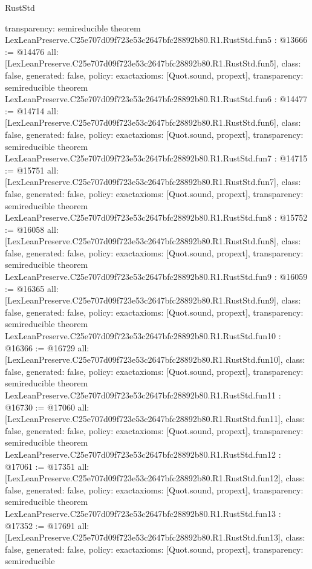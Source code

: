 \begin{lexlean}{RustStd}
\begin{coremodule}
{  transparency: semireducible
}
theorem LexLeanPreserve.C25e707d09f723e53c2647bfc28892b80.R1.RustStd.fun5 : @13666 := @14476 {
  all: [LexLeanPreserve.C25e707d09f723e53c2647bfc28892b80.R1.RustStd.fun5],
  class: false,
  generated: false,
  policy: exact{axioms: [Quot.sound, propext]},
  transparency: semireducible
}
theorem LexLeanPreserve.C25e707d09f723e53c2647bfc28892b80.R1.RustStd.fun6 : @14477 := @14714 {
  all: [LexLeanPreserve.C25e707d09f723e53c2647bfc28892b80.R1.RustStd.fun6],
  class: false,
  generated: false,
  policy: exact{axioms: [Quot.sound, propext]},
  transparency: semireducible
}
theorem LexLeanPreserve.C25e707d09f723e53c2647bfc28892b80.R1.RustStd.fun7 : @14715 := @15751 {
  all: [LexLeanPreserve.C25e707d09f723e53c2647bfc28892b80.R1.RustStd.fun7],
  class: false,
  generated: false,
  policy: exact{axioms: [Quot.sound, propext]},
  transparency: semireducible
}
theorem LexLeanPreserve.C25e707d09f723e53c2647bfc28892b80.R1.RustStd.fun8 : @15752 := @16058 {
  all: [LexLeanPreserve.C25e707d09f723e53c2647bfc28892b80.R1.RustStd.fun8],
  class: false,
  generated: false,
  policy: exact{axioms: [Quot.sound, propext]},
  transparency: semireducible
}
theorem LexLeanPreserve.C25e707d09f723e53c2647bfc28892b80.R1.RustStd.fun9 : @16059 := @16365 {
  all: [LexLeanPreserve.C25e707d09f723e53c2647bfc28892b80.R1.RustStd.fun9],
  class: false,
  generated: false,
  policy: exact{axioms: [Quot.sound, propext]},
  transparency: semireducible
}
theorem LexLeanPreserve.C25e707d09f723e53c2647bfc28892b80.R1.RustStd.fun10 : @16366 := @16729 {
  all: [LexLeanPreserve.C25e707d09f723e53c2647bfc28892b80.R1.RustStd.fun10],
  class: false,
  generated: false,
  policy: exact{axioms: [Quot.sound, propext]},
  transparency: semireducible
}
theorem LexLeanPreserve.C25e707d09f723e53c2647bfc28892b80.R1.RustStd.fun11 : @16730 := @17060 {
  all: [LexLeanPreserve.C25e707d09f723e53c2647bfc28892b80.R1.RustStd.fun11],
  class: false,
  generated: false,
  policy: exact{axioms: [Quot.sound, propext]},
  transparency: semireducible
}
theorem LexLeanPreserve.C25e707d09f723e53c2647bfc28892b80.R1.RustStd.fun12 : @17061 := @17351 {
  all: [LexLeanPreserve.C25e707d09f723e53c2647bfc28892b80.R1.RustStd.fun12],
  class: false,
  generated: false,
  policy: exact{axioms: [Quot.sound, propext]},
  transparency: semireducible
}
theorem LexLeanPreserve.C25e707d09f723e53c2647bfc28892b80.R1.RustStd.fun13 : @17352 := @17691 {
  all: [LexLeanPreserve.C25e707d09f723e53c2647bfc28892b80.R1.RustStd.fun13],
  class: false,
  generated: false,
  policy: exact{axioms: [Quot.sound, propext]},
  transparency: semireducible
}
\end{coremodule}
\end{lexlean}
